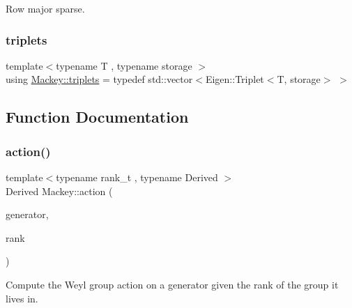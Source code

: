 Row major sparse. 

\mbox{\label{namespaceMackey_a0b8cd52f81199d53fa1e93946d8115ef}} 
\subsubsection{\texorpdfstring{triplets}{triplets}}
{\footnotesize\ttfamily template$<$typename T , typename storage $>$ \\
using \hyperlink{namespaceMackey_a0b8cd52f81199d53fa1e93946d8115ef}{Mackey\+::triplets} = typedef std\+::vector$<$Eigen\+::\+Triplet$<$T, storage$>$ $>$}



\subsection{Function Documentation}
\mbox{\label{namespaceMackey_aa515b26c0fbc7f19b36cee7d826f07b9}} 
\subsubsection{\texorpdfstring{action()}{action()}\hspace{0.1cm}{\footnotesize\ttfamily [1/2]}}
{\footnotesize\ttfamily template$<$typename rank\+\_\+t , typename Derived $>$ \\
Derived Mackey\+::action (\begin{DoxyParamCaption}\item[{const Eigen\+::\+Matrix\+Base$<$ Derived $>$ \&}]{generator,  }\item[{const rank\+\_\+t \&}]{rank }\end{DoxyParamCaption})}



Compute the Weyl group action on a generator given the rank of the group it lives in. 

